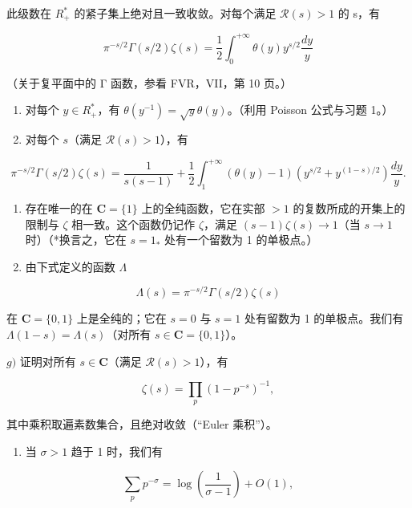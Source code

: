 此级数在 \(R_{+}^{*}\) 的紧子集上绝对且一致收敛。对每个满足 \(\mathcal{R}(s)>1\) 的 s，有

\[
\pi^ {- s / 2} \Gamma (s / 2) \zeta (s) = \frac {1}{2} \int_ {0} ^ {+ \infty} \theta (y) y ^ {s / 2} \frac {d y}{y}
\]

（关于复平面中的 Γ 函数，参看 FVR，VII，第 10 页。）

\begin{enumerate}
\def\labelenumi{\alph{enumi})}
\setcounter{enumi}{2}
\item
  对每个 \(y \in R_{+}^{*}\)，有 \(\theta(y^{-1}) = \sqrt{y}\theta(y)\)。（利用 Poisson 公式与习题 1。）
\item
  对每个 \(s\)（满足 \(\mathcal{R}(s) > 1\)），有
\end{enumerate}

\[
\pi^ {- s / 2} \Gamma (s / 2) \zeta (s) = \frac {1}{s (s - 1)} + \frac {1}{2} \int_ {1} ^ {+ \infty} (\theta (y) - 1) (y ^ {s / 2} + y ^ {(1 - s) / 2}) \frac {d y}{y}.
\]

\begin{enumerate}
\def\labelenumi{\alph{enumi})}
\setcounter{enumi}{4}
\item
  存在唯一的在 \(\mathbf{C} = \{1\}\) 上的全纯函数，它在实部 \(>1\) 的复数所成的开集上的限制与 \(\zeta\) 相一致。这个函数仍记作 \(\zeta\)，满足 \((s - 1)\zeta(s) \to 1\)（当 \(s \to 1\) 时）（*换言之，它在 \(s = 1_*\) 处有一个留数为 1 的单极点。）
\item
  由下式定义的函数 \(\Lambda\)
\end{enumerate}

\[
\Lambda (s) = \pi^ {- s / 2} \Gamma (s / 2) \zeta (s)
\]

在 \(\mathbf{C} = \{0,1\}\) 上是全纯的；它在 \(s = 0\) 与 \(s = 1\) 处有留数为 1 的单极点。我们有 \(\Lambda(1 - s) = \Lambda(s)\)（对所有 \(s \in \mathbf{C} = \{0,1\}\)）。

\(g)\) 证明对所有 \(s \in \mathbf{C}\)（满足 \(\mathcal{R}(s) > 1\)），有

\[
\zeta (s) = \prod_ {p} (1 - p ^ {- s}) ^ {- 1},
\]

其中乘积取遍素数集合，且绝对收敛（“Euler 乘积”）。

\begin{enumerate}
\def\labelenumi{\alph{enumi})}
\setcounter{enumi}{7}
\tightlist
\item
  当 \(\sigma > 1\) 趋于 1 时，我们有
\end{enumerate}

\[
\sum_ {p} p ^ {- \sigma} = \log \left(\frac {1}{\sigma - 1}\right) + O (1),
\]

